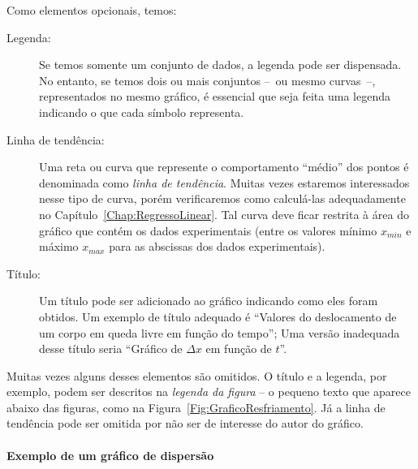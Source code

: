 \noindent{}Como elementos opcionais, temos:
\begin{description}
	\item[Legenda:] Se temos somente um conjunto de dados, a legenda pode ser dispensada. No entanto, se temos dois ou mais conjuntos --~ou mesmo curvas~--, representados no mesmo gráfico, é essencial que seja feita uma legenda indicando o que cada símbolo representa.
	\item[Linha de tendência:] Uma reta ou curva que represente o comportamento ``médio'' dos pontos é denominada como \emph{linha de tendência}. Muitas vezes estaremos interessados nesse tipo de curva, porém verificaremos como calculá-las adequadamente no Capítulo~\ref{Chap:RegressoLinear}. Tal curva deve ficar restrita à área do gráfico que contém os dados experimentais (entre os valores mínimo $x_{min}$ e máximo $x_{max}$ para as abscissas dos dados experimentais).
	\item[Título:] Um título pode ser adicionado ao gráfico indicando como eles foram obtidos. Um exemplo de título adequado é ``Valores do deslocamento de um corpo em queda livre em função do tempo''; Uma versão inadequada desse título seria ``Gráfico de $\Delta x$ em função de $t$''.
\end{description}
%
Muitas vezes alguns desses elementos são omitidos. O título e a legenda, por exemplo, podem ser descritos na \emph{legenda da figura} -- o pequeno texto que aparece abaixo das figuras, como na Figura~\ref{Fig:GraficoResfriamento}. Já a linha de tendência pode ser omitida por não ser de interesse do autor do gráfico.

\paragraph{Exemplo de um gráfico de dispersão}

